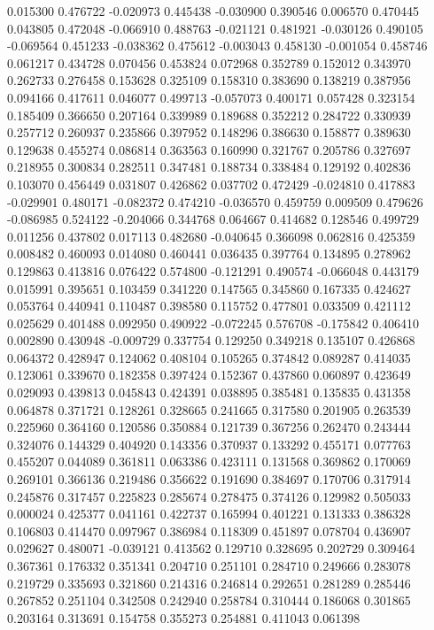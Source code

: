 0.015300
0.476722
-0.020973
0.445438
-0.030900
0.390546
0.006570
0.470445
0.043805
0.472048
-0.066910
0.488763
-0.021121
0.481921
-0.030126
0.490105
-0.069564
0.451233
-0.038362
0.475612
-0.003043
0.458130
-0.001054
0.458746
0.061217
0.434728
0.070456
0.453824
0.072968
0.352789
0.152012
0.343970
0.262733
0.276458
0.153628
0.325109
0.158310
0.383690
0.138219
0.387956
0.094166
0.417611
0.046077
0.499713
-0.057073
0.400171
0.057428
0.323154
0.185409
0.366650
0.207164
0.339989
0.189688
0.352212
0.284722
0.330939
0.257712
0.260937
0.235866
0.397952
0.148296
0.386630
0.158877
0.389630
0.129638
0.455274
0.086814
0.363563
0.160990
0.321767
0.205786
0.327697
0.218955
0.300834
0.282511
0.347481
0.188734
0.338484
0.129192
0.402836
0.103070
0.456449
0.031807
0.426862
0.037702
0.472429
-0.024810
0.417883
-0.029901
0.480171
-0.082372
0.474210
-0.036570
0.459759
0.009509
0.479626
-0.086985
0.524122
-0.204066
0.344768
0.064667
0.414682
0.128546
0.499729
0.011256
0.437802
0.017113
0.482680
-0.040645
0.366098
0.062816
0.425359
0.008482
0.460093
0.014080
0.460441
0.036435
0.397764
0.134895
0.278962
0.129863
0.413816
0.076422
0.574800
-0.121291
0.490574
-0.066048
0.443179
0.015991
0.395651
0.103459
0.341220
0.147565
0.345860
0.167335
0.424627
0.053764
0.440941
0.110487
0.398580
0.115752
0.477801
0.033509
0.421112
0.025629
0.401488
0.092950
0.490922
-0.072245
0.576708
-0.175842
0.406410
0.002890
0.430948
-0.009729
0.337754
0.129250
0.349218
0.135107
0.426868
0.064372
0.428947
0.124062
0.408104
0.105265
0.374842
0.089287
0.414035
0.123061
0.339670
0.182358
0.397424
0.152367
0.437860
0.060897
0.423649
0.029093
0.439813
0.045843
0.424391
0.038895
0.385481
0.135835
0.431358
0.064878
0.371721
0.128261
0.328665
0.241665
0.317580
0.201905
0.263539
0.225960
0.364160
0.120586
0.350884
0.121739
0.367256
0.262470
0.243444
0.324076
0.144329
0.404920
0.143356
0.370937
0.133292
0.455171
0.077763
0.455207
0.044089
0.361811
0.063386
0.423111
0.131568
0.369862
0.170069
0.269101
0.366136
0.219486
0.356622
0.191690
0.384697
0.170706
0.317914
0.245876
0.317457
0.225823
0.285674
0.278475
0.374126
0.129982
0.505033
0.000024
0.425377
0.041161
0.422737
0.165994
0.401221
0.131333
0.386328
0.106803
0.414470
0.097967
0.386984
0.118309
0.451897
0.078704
0.436907
0.029627
0.480071
-0.039121
0.413562
0.129710
0.328695
0.202729
0.309464
0.367361
0.176332
0.351341
0.204710
0.251101
0.284710
0.249666
0.283078
0.219729
0.335693
0.321860
0.214316
0.246814
0.292651
0.281289
0.285446
0.267852
0.251104
0.342508
0.242940
0.258784
0.310444
0.186068
0.301865
0.203164
0.313691
0.154758
0.355273
0.254881
0.411043
0.061398
